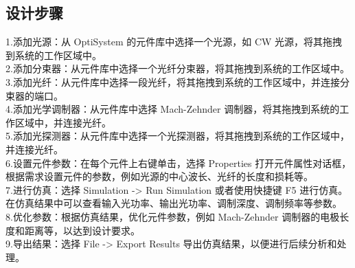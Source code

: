 \documentclass[12pt, a4paper, oneside]{article}
\begin{document}
\begin{spacing}{2.0}
\section{设计步骤}
1.添加光源：从 OptiSystem 的元件库中选择一个光源，如 CW 光源，将其拖拽到系统的工作区域中。
\\
2.添加分束器：从元件库中选择一个光纤分束器，将其拖拽到系统的工作区域中。
\\
3.添加光纤：从元件库中选择一段光纤，将其拖拽到系统的工作区域中，并连接分束器的端口。
\\
4.添加光学调制器：从元件库中选择 Mach-Zehnder 调制器，将其拖拽到系统的工作区域中，并连接光纤。
\\
5.添加光探测器：从元件库中选择一个光探测器，将其拖拽到系统的工作区域中，并连接光纤。
\\
6.设置元件参数：在每个元件上右键单击，选择 Properties 打开元件属性对话框，根据需求设置元件的参数，例如光源的中心波长、光纤的长度和损耗等。
\\
7.进行仿真：选择 Simulation -> Run Simulation 或者使用快捷键 F5 进行仿真。在仿真结果中可以查看输入光功率、输出光功率、调制深度、调制频率等参数。
\\
8.优化参数：根据仿真结果，优化元件参数，例如 Mach-Zehnder 调制器的电极长度和距离等，以达到设计要求。
\\
9.导出结果：选择 File -> Export Results 导出仿真结果，以便进行后续分析和处理。











\end{spacing}{}


\end{document}
